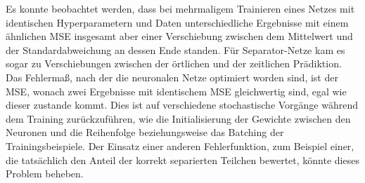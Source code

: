 Es konnte beobachtet werden, dass bei mehrmaligem Trainieren eines Netzes 
mit identischen Hyperparametern und Daten unterschiedliche Ergebnisse mit einem ähnlichen MSE insgesamt aber einer Verschiebung zwischen dem Mittelwert und der Standardabweichung  
an dessen Ende standen.
Für Separator-Netze kam es sogar zu Verschiebungen zwischen der örtlichen und der zeitlichen Prädiktion.
Das Fehlermaß, nach der die neuronalen Netze optimiert worden sind, ist der MSE, wonach zwei Ergebnisse mit identischem MSE gleichwertig sind, egal wie dieser zustande kommt.
Dies ist auf verschiedene stochastische Vorgänge während dem Training zurückzuführen, wie die Initialisierung der Gewichte zwischen den Neuronen und die Reihenfolge beziehungsweise das Batching der Trainingsbeispiele.
Der Einsatz einer anderen Fehlerfunktion, zum Beispiel einer, die tatsächlich den Anteil der korrekt separierten Teilchen bewertet, könnte dieses Problem beheben.
